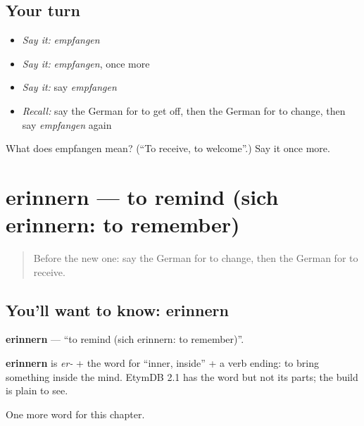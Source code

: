 \subsection*{Your turn}
\begin{itemize}
\raggedright
  \item \emph{Say it:} \emph{empfangen}
  \item \emph{Say it:} \emph{empfangen}, once more
  \item \emph{Say it:} say \emph{empfangen}
  \item \emph{Recall:} say the German for to get off, then the German for to change, then say \emph{empfangen} again
\end{itemize}

\begin{tcolorbox}[breakable,colback=teal!4,colframe=teal!35!black,title={Before you move on}]
What does empfangen mean? (\textquotedblleft{}To receive, to welcome\textquotedblright{}.) Say it once more.
\end{tcolorbox}
\section[erinnern]{erinnern — to remind (sich erinnern: to remember)}

\label{lesson:GE-C179-erinnern}



\begin{quote}
Before the new one: say the German for to change, then the German for to receive.
\end{quote}

\subsection*{You'll want to know: erinnern}
\textbf{erinnern} — \textquotedblleft{}to remind (sich erinnern: to remember)\textquotedblright{}.

\begin{cousinweb}
\textbf{erinnern} is \emph{er-} + the word for \textquotedblleft{}inner, inside\textquotedblright{} + a verb ending: to bring something inside the mind. EtymDB 2.1 has the word but not its parts; the build is plain to see.
\end{cousinweb}

\begin{grammarlens}[title={What you've built}]
One more word for this chapter.
\end{grammarlens}

